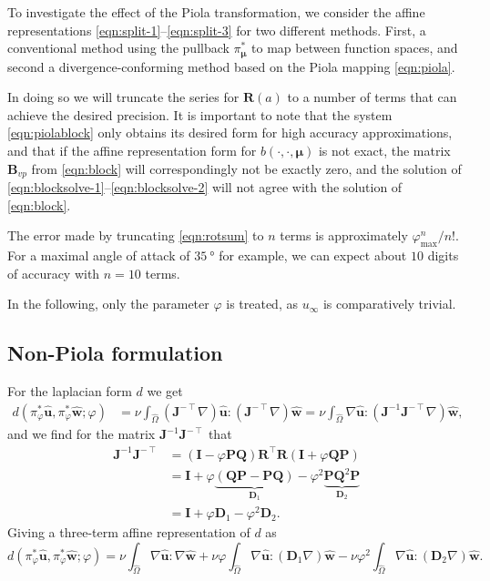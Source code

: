 \documentclass[onecolumn, twoside, a4paper, 11pt]{article}
\begin{document}
To investigate the effect of the Piola transformation, we consider the affine
representations \eqref{eqn:split-1}--\eqref{eqn:split-3} for two different
methods. First, a conventional method using the pullback $\pi_{\bm \mu}^*$ to
map between function spaces, and second a divergence-conforming method based on
the Piola mapping \eqref{eqn:piola}.

In doing so we will truncate the series for $\bm R(a)$ to a number of terms that
can achieve the desired precision. It is important to note that the system
\eqref{eqn:piolablock} only obtains its desired form for high accuracy
approximations, and that if the affine representation form for
$b(\cdot,\cdot,\bm \mu)$ is not exact, the matrix $\bm B_{vp}$ from
\eqref{eqn:block} will correspondingly not be exactly zero, and the solution of
\eqref{eqn:blocksolve-1}--\eqref{eqn:blocksolve-2} will not agree with the
solution of \eqref{eqn:block}.

The error made by truncating \eqref{eqn:rotsum} to $n$ terms is approximately
$\varphi_\text{max}^n / n!$. For a maximal angle of attack of
$\SI{35}{\degree}$ for example, we can expect about $10$ digits of accuracy
with $n=10$ terms.

In the following, only the parameter $\varphi$ is treated, as $u_\infty$ is
comparatively trivial.

\subsection{Non-Piola formulation}

For the laplacian form $d$ we get
\begin{align}
  d(
    \pi_{\varphi}^* \hat{\bm u},
    \pi_{\varphi}^* \hat{\bm w};
    \varphi
  )
  &= \nu \int_{\hat{\Omega}} (\bm J^{-\intercal} \nabla) \hat{\bm u} : (\bm J^{-\intercal} \nabla) \hat{\bm w}
  = \nu \int_{\hat{\Omega}} \nabla \hat{\bm u} : (\bm J^{-1} \bm J^{-\intercal} \nabla) \hat{\bm w},
\end{align}
and we find for the matrix $\bm J^{-1} \bm J^{-\intercal}$ that
\begin{align}
  \nonumber
  \bm J^{-1} \bm J^{-\intercal}
  &= (\bm I - \varphi \bm P \bm Q) \bm R^\intercal
    \bm R (\bm I + \varphi \bm Q \bm P) \\
  \nonumber
  &= \bm I + \varphi \underbrace{(\bm Q \bm P - \bm P \bm Q)}_{\bm D_1}
    - \varphi^2 \underbrace{\bm P \bm Q^2 \bm P}_{\bm D_2} \\
  &= \bm I + \varphi \bm D_1 - \varphi^2 \bm D_2.
\end{align}
Giving a three-term affine representation of $d$ as
\begin{equation}
  d(
    \pi_{\varphi}^* \hat{\bm u},
    \pi_{\varphi}^* \hat{\bm w};
    \varphi
  ) =
  \nu \int_{\hat{\Omega}} \nabla \hat{\bm u} : \nabla \hat{\bm w}
  + \nu \varphi \int_{\hat{\Omega}}
  \nabla \hat{\bm u} : (\bm D_1 \nabla) \hat{\bm w}
  - \nu \varphi^2 \int_{\hat{\Omega}}
  \nabla \hat{\bm u} : (\bm D_2 \nabla) \hat{\bm w}.
\end{equation}
\end{document}
